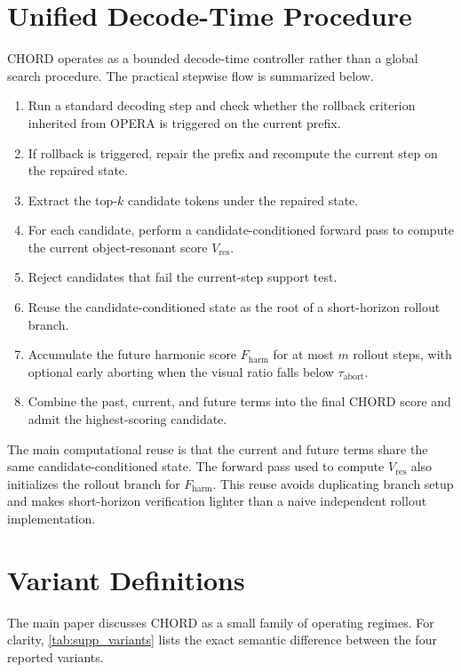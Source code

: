 \documentclass[sigconf,anonymous,nonacm]{acmart}
\begin{document}
\section{Unified Decode-Time Procedure}
\label{sec:supp_decode}

CHORD operates as a bounded decode-time controller rather than a global search procedure. The practical stepwise flow is summarized below.

\begin{enumerate}
    \item Run a standard decoding step and check whether the rollback criterion inherited from OPERA is triggered on the current prefix.
    \item If rollback is triggered, repair the prefix and recompute the current step on the repaired state.
    \item Extract the top-$k$ candidate tokens under the repaired state.
    \item For each candidate, perform a candidate-conditioned forward pass to compute the current object-resonant score $V_{\mathrm{res}}$.
    \item Reject candidates that fail the current-step support test.
    \item Reuse the candidate-conditioned state as the root of a short-horizon rollout branch.
    \item Accumulate the future harmonic score $F_{\mathrm{harm}}$ for at most $m$ rollout steps, with optional early aborting when the visual ratio falls below $\tau_{\mathrm{abort}}$.
    \item Combine the past, current, and future terms into the final CHORD score and admit the highest-scoring candidate.
\end{enumerate}

The main computational reuse is that the current and future terms share the same candidate-conditioned state. The forward pass used to compute $V_{\mathrm{res}}$ also initializes the rollout branch for $F_{\mathrm{harm}}$. This reuse avoids duplicating branch setup and makes short-horizon verification lighter than a naive independent rollout implementation.

\section{Variant Definitions}
\label{sec:supp_variants}

The main paper discusses CHORD as a small family of operating regimes. For clarity, \autoref{tab:supp_variants} lists the exact semantic difference between the four reported variants.
\end{document}
